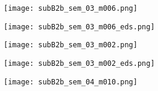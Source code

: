 \begin{figure}[htbp]
    \centering
    \begin{subfigure}[t]{\textwidth}
        \caption{}\label{fig:subB2b_alumina}
          \begin{minipage}[c]{0.43\linewidth}
            \centering
            \texttt{[image: subB2b\_sem\_03\_m006.png]}
          \end{minipage}
          \hfill
          \begin{minipage}[c]{0.43\linewidth}
            \centering
            \texttt{[image: subB2b\_sem\_03\_m006\_eds.png]}
          \end{minipage}
          \begin{minipage}[c]{0.11\linewidth}
            \centering
            \atomicTable[\ce{O}&\SI{43.0}{}][\ce{Al}&\SI{24.7}{}][\ce{Cd}&\SI{15.2}{}][\ce{Te}&\SI{14.8}{}][\ce{C}&\SI{1.6}{}][\ce{Zn}&\SI{0.5}{}][\ce{Si}&\SI{0.2}{}]%
          \end{minipage}
    \end{subfigure}
    \par\bigskip
    \begin{subfigure}[t]{\textwidth}
        \caption{}\label{fig:subB2b_czt}
          \begin{minipage}[c]{0.43\linewidth}
            \centering
            \texttt{[image: subB2b\_sem\_03\_m002.png]}
          \end{minipage}
          \hfill
          \begin{minipage}[c]{0.43\linewidth}
            \centering
            \texttt{[image: subB2b\_sem\_03\_m002\_eds.png]}
          \end{minipage}
          \begin{minipage}[c]{0.11\linewidth}
            \centering
            \atomicTable[\ce{Cd}&\SI{44.8}{}][\ce{Te}&\SI{44.6}{}][\ce{Zn}&\SI{1.9}{}][\ce{C}&\SI{6.4}{}][\ce{O}&\SI{1.1}{}][\ce{Al}&\SI{0.7}{}][\ce{Si}&\SI{0.5}{}]%
          \end{minipage}
    \end{subfigure}
    \par\bigskip
    \begin{subfigure}[t]{\textwidth}
        \caption{}\label{fig:subB2b_mct}
          \begin{minipage}[c]{0.43\linewidth}
            \centering
            \texttt{[image: subB2b\_sem\_04\_m010.png]}
          \end{minipage}

\end{subfigure}
\end{figure}
